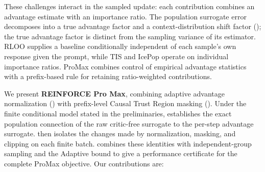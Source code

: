These challenges interact in the sampled update: each contribution combines an advantage estimate with an importance ratio.
The population surrogate error decomposes into a true advantage factor and a context-distribution shift factor
(); the true advantage factor is distinct from the sampling variance of its estimator.
RLOO supplies a baseline conditionally independent of each sample's own response given the prompt, while TIS and IcePop operate on individual importance ratios.
ProMax combines control of empirical advantage statistics with a prefix-based rule for retaining ratio-weighted contributions.

We present \textbf{REINFORCE Pro Max}, combining adaptive advantage normalization () with prefix-level Causal
Trust Region masking (). Under the finite conditional model stated in the preliminaries,
 establishes the exact population connection of the raw critic-free surrogate to the per-step
advantage surrogate.  then isolates the changes made by
normalization, masking, and clipping on each finite batch.
 combines these identities with independent-group
sampling and the Adaptive bound to give a performance certificate for the
complete ProMax objective. Our contributions are:

